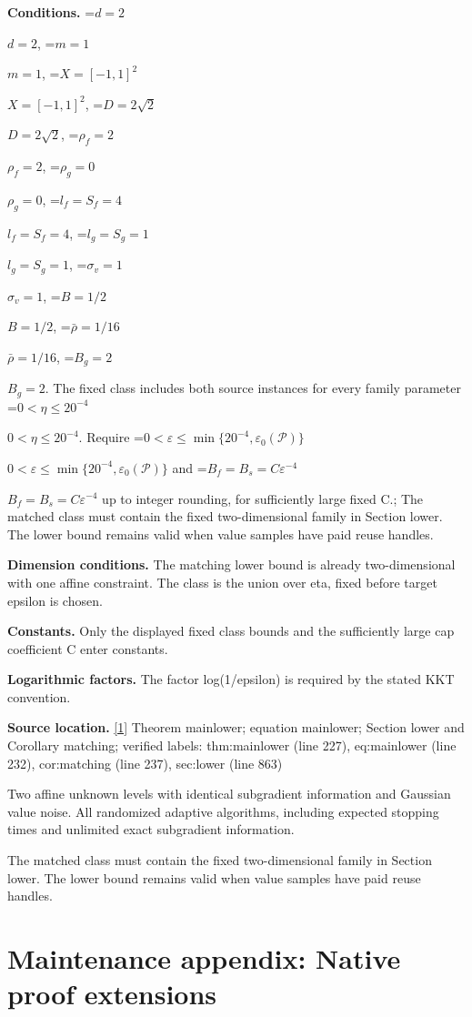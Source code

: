 \documentclass[10pt,a4paper]{article}
\newcommand{\AtlasMath}[1]{\par\begingroup\centering\setbox0=\hbox{$\displaystyle #1$}\ifdim\wd0>1.4\linewidth\typeout{ATLAS WIDE FORMULA: \the\wd0}\fi\ifdim\wd0>\linewidth\resizebox{\linewidth}{!}{\box0}\else\box0\fi\par\endgroup}
\newcommand{\AtlasInlineMath}[1]{\begingroup\setbox0=\hbox{$#1$}\ifdim\wd0>.4\linewidth\endgroup\AtlasMath{#1}\else\endgroup$#1$\fi}
\begin{document}
\textbf{Conditions.} \AtlasInlineMath{d=2}, \AtlasInlineMath{m=1}, \AtlasInlineMath{X=[-1,1]^2}, \AtlasInlineMath{D=2\sqrt2}, \AtlasInlineMath{\rho_f=2}, \AtlasInlineMath{\rho_g=0}, \AtlasInlineMath{l_f=S_f=4}, \AtlasInlineMath{l_g=S_g=1}, \AtlasInlineMath{\sigma_v=1}, \AtlasInlineMath{B=1/2}, \AtlasInlineMath{\bar\rho=1/16}, \AtlasInlineMath{B_g=2}. The fixed class includes both source instances for every family parameter \AtlasInlineMath{0<\eta\le20^{-4}}. Require \AtlasInlineMath{0<\varepsilon\le\min\{20^{-4},\varepsilon_0(\mathcal P)\}} and \AtlasInlineMath{B_f=B_s=C\varepsilon^{-4}} up to integer rounding, for sufficiently large fixed C.; The matched class must contain the fixed two-dimensional family in Section lower. The lower bound remains valid when value samples have paid reuse handles.



\textbf{Dimension conditions.} The matching lower bound is already two-dimensional with one affine constraint. The class is the union over eta, fixed before target epsilon is chosen.



\textbf{Constants.} Only the displayed fixed class bounds and the sufficiently large cap coefficient C enter constants.



\textbf{Logarithmic factors.} The factor log(1/epsilon) is required by the stated KKT convention.



\textbf{Source location.} \href{https://github.com/WU-Wendao/Colombo/blob/main/colombo_sensorium/Complexity_altas/data/sources/colombo/N10/manuscript.pdf}{[1]} Theorem mainlower; equation mainlower; Section lower and Corollary matching; verified labels: thm:mainlower (line 227), eq:mainlower (line 232), cor:matching (line 237), sec:lower (line 863)



Two affine unknown levels with identical subgradient information and Gaussian value noise. All randomized adaptive algorithms, including expected stopping times and unlimited exact subgradient information.



The matched class must contain the fixed two-dimensional family in Section lower. The lower bound remains valid when value samples have paid reuse handles.



\section{Maintenance appendix: Native proof extensions}
\end{document}
